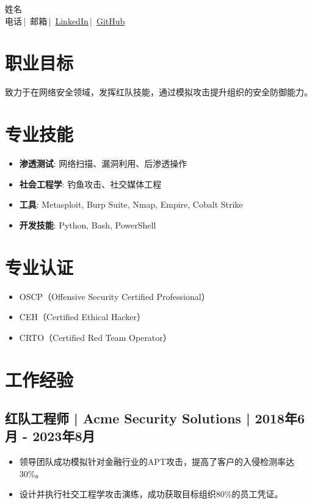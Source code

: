 \documentclass[a4paper,10pt]{article}
\newcommand{\name}{姓名}
\newcommand{\phone}{电话}
\newcommand{\email}{邮箱}
\newcommand{\linkedin}{\href{https://www.linkedin.com/in/username}{LinkedIn}}
\newcommand{\github}{\href{https://github.com/username}{GitHub}}
\begin{document}
\begin{center}
    {\LARGE \name} \\
    \phone \,|\, \email \,|\, \linkedin \,|\, \github \\
\end{center}

\vspace{0.5em}

\section*{职业目标}
致力于在网络安全领域，发挥红队技能，通过模拟攻击提升组织的安全防御能力。

\section*{专业技能}
\begin{itemize}[leftmargin=*]
    \item \textbf{渗透测试}: 网络扫描、漏洞利用、后渗透操作
    \item \textbf{社会工程学}: 钓鱼攻击、社交媒体工程
    \item \textbf{工具}: Metasploit, Burp Suite, Nmap, Empire, Cobalt Strike
    \item \textbf{开发技能}: Python, Bash, PowerShell
\end{itemize}

\section*{专业认证}
\begin{itemize}[leftmargin=*]
    \item OSCP（Offensive Security Certified Professional）
    \item CEH（Certified Ethical Hacker）
    \item CRTO（Certified Red Team Operator）
\end{itemize}

\section*{工作经验}

\subsection*{红队工程师 | Acme Security Solutions | 2018年6月 - 2023年8月}
\begin{itemize}[leftmargin=*]
    \item 领导团队成功模拟针对金融行业的APT攻击，提高了客户的入侵检测率达30\%。
    \item 设计并执行社交工程学攻击演练，成功获取目标组织80\%的员工凭证。
\end{itemize}
\end{document}
